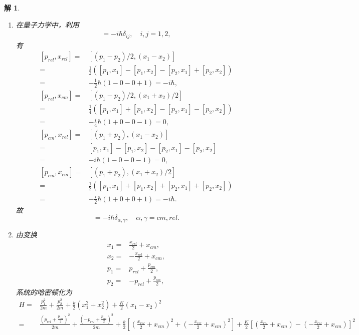 \documentclass[UTF8,10pt,a4paper]{article}
\theoremstyle{Problem}
\theoremstyle{Solution}
\newtheorem*{sol}{解}
\begin{document}
\begin{sol}
\begin{enumerate}
        \item[(b)] 在量子力学中，利用
        \begin{align}
            [p_i,x_j]=-i\hbar\delta_{ij},\quad i,j=1,2,
        \end{align}
        有
        \begin{align}
            \nonumber[p_{rel},x_{rel}]=&[(p_1-p_2)/2,(x_1-x_2)]\\
            \nonumber=&\frac{1}{2}([p_1,x_1]-[p_1,x_2]-[p_2,x_1]+[p_2,x_2])\\
            =&-\frac{1}{2}\hbar(1-0-0+1)=-i\hbar,\\
            \nonumber[p_{rel},x_{cm}]=&[(p_1-p_2)/2,(x_1+x_2)/2]\\
            \nonumber=&\frac{1}{4}([p_1,x_1]+[p_1,x_2]-[p_2,x_1]-[p_2,x_2])\\
            =&-\frac{i}{4}\hbar(1+0-0-1)=0,\\
            \nonumber[p_{cm},x_{rel}]=&[(p_1+p_2),(x_1-x_2)]\\
            \nonumber=&[p_1,x_1]-[p_1,x_2]-[p_2,x_1]-[p_2,x_2]\\
            =&-i\hbar(1-0-0-1)=0,\\
            \nonumber[p_{cm},x_{cm}]=&[(p_1+p_2),(x_1+x_2)/2]\\
            \nonumber=&\frac{1}{2}([p_1,x_1]+[p_1,x_2]+[p_2,x_1]+[p_2,x_2])\\
            =&-\frac{i}{2}\hbar(1+0+0+1)=-i\hbar.
        \end{align}
        故
        \begin{equation}
            [p_{\alpha},x_{\gamma}]=-i\hbar\delta_{\alpha,\gamma},\quad \alpha,\gamma=cm,rel.
        \end{equation}
        \item[(c)] 由变换
        \begin{align}
            x_1=&\frac{x_{rel}}{2}+x_{cm},\\
            x_2=&-\frac{x_{rel}}{2}+x_{cm},\\
            p_1=&p_{rel}+\frac{p_{cm}}{2},\\
            p_2=&-p_{rel}+\frac{p_{cm}}{2},
        \end{align}
        系统的哈密顿化为
        \begin{align}
            \nonumber H=&\frac{p_1^2}{2m}+\frac{p_2^2}{2m}+\frac{k}{2}(x_1^2+x_2^2)+\frac{K}{2}(x_1-x_2)^2\\
            \nonumber=&\frac{\left(p_{rel}+\frac{p_{cm}}{2}\right)^2}{2m}+\frac{(-p_{rel}+\frac{p_{cm}}{2})^2}{2m}+\frac{k}{2}\left[\left(\frac{x_{rel}}{2}+x_{cm}\right)^2+\left(-\frac{x_{rel}}{2}+x_{cm}\right)^2\right]+\frac{K}{2}\left[\left(\frac{x_{rel}}{2}+x_{cm}\right)-\left(-\frac{x_{rel}}{2}+x_{cm}\right)\right]^2\\

\end{align}
\end{enumerate}
\end{sol}
\end{document}
